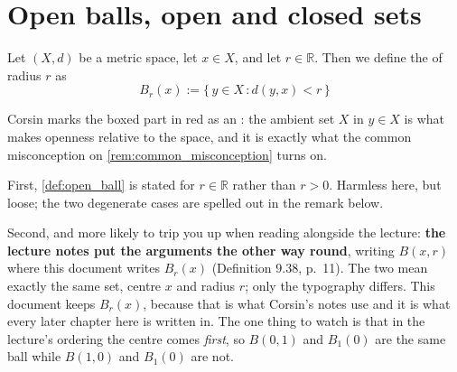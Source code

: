 
\section{Open balls, open and closed sets}
\label{sec:open_closed_sets}

\begin{definition}
\label{def:open_ball}
Let $(X,d)$ be a metric space, let $x \in X$, and let $r \in \mathbb{R}$. Then we define the
 of radius $r$ as
\[B_r(x) := \{\,\boxed{y \in X}\, : d(y,x) < r\,\}\]
\end{definition}

\begin{importantremark}
Corsin marks the boxed part in red as an : the ambient set $X$ in
$y \in X$ is what makes openness relative to the space, and it is exactly what the common
misconception on \cref{rem:common_misconception} turns on.
\end{importantremark}

\begin{ainote}
\label{ainote:ball_notation}
First, \cref{def:open_ball} is stated for $r \in \mathbb{R}$ rather than $r > 0$. Harmless here,
but loose; the two degenerate cases are spelled out in the remark below.

Second, and more likely to trip you up when reading alongside the lecture: \textbf{the lecture
notes put the arguments the other way round}, writing $B(x,r)$ where this document writes
$B_r(x)$ (Definition 9.38, p.\ 11). The two mean exactly the same set, centre $x$ and radius $r$;
only the typography differs. This document keeps $B_r(x)$, because that is what Corsin's notes
use and it is what every later chapter here is written in. The one thing to watch is that in the
lecture's ordering the centre comes \emph{first}, so $B(0,1)$ and $B_1(0)$ are the same ball
while $B(1,0)$ and $B_1(0)$ are not.
\end{ainote}

